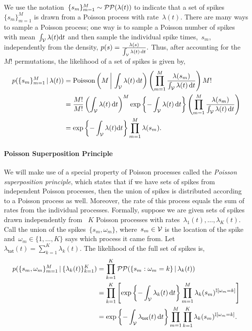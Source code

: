 We use the notation~${\{s_m\}_{m=1}^M\sim\mathcal{PP}(\lambda(t))}$ to indicate
that a set of spikes~$\{s_m\}_{m=1}^M$ is drawn from a Poisson process
with rate~$\lambda(t)$. There are many ways to sample a Poisson
process; one way is to sample a Poisson number of spikes with
mean~${\int_{\mathcal{V}} \lambda(t) \mathrm{d}t}$ and then sample the individual
spike times,~$s_m$, independently from the density,
${
  p(s) = \frac{\lambda(s)}{\int_{\mathcal{V}} \lambda(t) \, \mathrm{d}t}.
}$
Thus, after accounting for the~$M!$ permutations,
the likelihood of a set of spikes is given by,
\begin{align}
  \nonumber
  p(\{s_m\}_{m=1}^M \,|\, \lambda(t))
  &= \mathrm{Poisson} \left(M \, \bigg| \, \int_{\mathcal{V}} \lambda(t) \, \mathrm{d} t \right)
  \left( \prod_{m=1}^M \frac{\lambda(s_m)}{\int_{\mathcal{V}} \lambda(t) \, \mathrm{d}t} \right)  M! \\
  \nonumber
  &= \frac{M!}{M!} \left(\int_{\mathcal{V}} \lambda(t) \, \mathrm{d} t \right)^M
  \exp \left \{-\int_{\mathcal{V}} \lambda(t) \, \mathrm{d} t \right \} 
  \left( \prod_{m=1}^M \frac{\lambda(s_m)}{\int_{\mathcal{V}} \lambda(t) \, \mathrm{d}t} \right) \\
  \label{eq:poisson_lkhd}
  &=\exp\left\{-\int_{\mathcal{V}}\lambda(t)\mathrm{d}t \right\}
  \prod_{m=1}^M\lambda(s_m).
\end{align}

\paragraph{Poisson Superposition Principle}
We will make use of a special property of Poisson processes called the
\emph{Poisson superposition principle}, which states that if we have 
sets of spikes from independent Poisson processes, then the union of spikes 
is distributed according to a Poisson process as well.
Moreover, the rate of this process equals the sum of 
rates from the individual processes. 
Formally, suppose we are given sets of spikes drawn independently
from ~$K$ Poisson processes with rates~${\lambda_1(t), \ldots,
  \lambda_K(t)}$.  Call the union of the spikes~${\{s_m,
  \omega_m\}}$, where~${s_m \in \mathcal{V}}$ is the location of the spike
and~${\omega_m \in \{1, \ldots, K\}}$ says which process it came
from. Let~${\lambda_{\mathsf{tot}}(t) = \sum_{k=1}^K \lambda_k(t)}$.
The likelihood of the full set of spikes is,
\begin{align*}
  p(\{s_m, \omega_m\}_{m=1}^M \,|\, \{\lambda_k(t)\}_{k=1}^K)
  &= \prod_{k=1}^K \mathcal{PP}(\{s_m: \omega_m=k\} \,|\, \lambda_k(t)) \\
  &= \prod_{k=1}^K \left[
    \exp\left\{-\int_{\mathcal{V}} \lambda_k(t) \, \mathrm{d}t\right\}
    \prod_{m=1}^M \lambda_k(s_m)^{\mathbb{I}[\omega_m = k]} \right] \\
  &= \exp\left\{-\int_{\mathcal{V}} \lambda_{\mathsf{tot}}(t) \, \mathrm{d}t\right\}
  \prod_{m=1}^M \prod_{k=1}^K \lambda_k(s_m)^{\mathbb{I}[\omega_m = k]}.
\end{align*}

